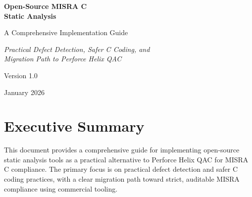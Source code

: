\documentclass[11pt,letterpaper]{report}
\begin{document}
\hypersetup{pageanchor=false}%
\begin{titlepage}
    \centering
    \vspace*{2cm}

    {\Huge\bfseries\color{headerblue} Open-Source MISRA C\\[0.3cm] Static Analysis\par}

    \vspace{1cm}

    {\LARGE\color{accentblue} A Comprehensive Implementation Guide\par}

    \vspace{1.5cm}

    {\large\itshape Practical Defect Detection, Safer C Coding, and\\Migration Path to Perforce Helix QAC\par}

    \vfill

    {\large Version 1.0\par}
    {\large January 2026\par}

    \vspace{2cm}
\end{titlepage}\hypersetup{pageanchor=true}

\tableofcontents
\newpage

\chapter{Executive Summary}

This document provides a comprehensive guide for implementing open-source static analysis tools as a practical alternative to Perforce Helix QAC for MISRA C compliance. The primary focus is on practical defect detection and safer C coding practices, with a clear migration path toward strict, auditable MISRA compliance using commercial tooling.
\end{document}

